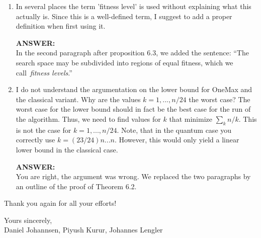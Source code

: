 \begin{enumerate}
{\bf ANSWER:}\\
We apologize that we indicated wrongly how we handled your comment!

We agree that the RLS can never create x itself as the next search point. We left the phrase ``except of $x$ itself in the quantum case'' because the membership oracle $M_{f,x}$ (the quantum analogue of the progressive selection strategy) explicitly forbids the search point $x$ (page 15, line 1). This is a crucial point: For example, the (1+1)EA has a constant probability of choosing $x$ itself again, and therefore we would get no speed-up at all if the quantum algorithm accepted search points to follow itself.

For this reason we would rather avoid the impression that the same search point is accepted in all cases (since it is not accepted in the quantum case).

If you think that the confusion we may possibly raise by the phrase ``(except x itself in the quantum case)'' is larger than by omitting it, then please tell us and we will remove the phrase.

\item In several places the term 'fitness level' is used without explaining what this actually is. Since this is a well-defined term, I suggest to add a proper definition when first using it.

{\bf ANSWER:}\\
In the second paragraph after proposition 6.3, we added the sentence: ``The search space may be subdivided into regions of equal fitness, which we call~\emph{fitness levels}.''

\item I do not understand the argumentation on the lower bound for OneMax and the classical variant. Why are the values $k=1,...,n/24$ the worst case? The worst case for the lower bound should in fact be the best case for the run of the algorithm. Thus, we need to find values for $k$ that minimize $\sum_{k} n/k$. This is not the case for $k=1,...,n/24$. Note, that in the quantum case you correctly use $k=(23/24)n...n$. However, this would only yield a linear lower bound in the classical case.

{\bf ANSWER:}\\
You are right, the argument was wrong. We replaced the two paragraphs by an outline of the proof of Theorem 6.2. 

\end{enumerate}

Thank you again for all your efforts!\bigskip

Yours sincerely,\\
Daniel Johannsen, Piyush Kurur, Johannes Lengler

